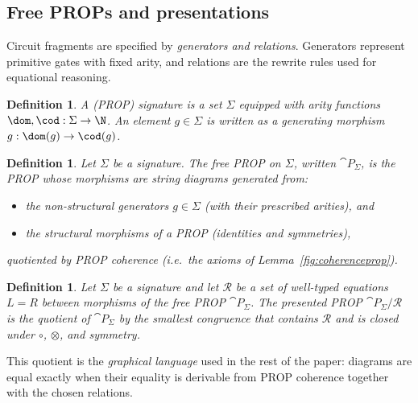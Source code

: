 \documentclass[10pt,a4paper]{article}
\newtheorem{definition}[theorem]{Definition}
\def\cref#1{Lemma~\ref{#1}}%
\begin{document}
\subsection{Free PROPs and presentations}\label{free-prop}

Circuit fragments are specified by \emph{generators and relations}.  Generators represent primitive
gates with fixed arity, and relations are the rewrite rules used for equational reasoning.

\begin{definition}\label{def:signature}
A \emph{(PROP) signature} is a set \(\Sigma\) equipped with arity functions
\(\dom,\cod:\Sigma\to\N\).
An element \(g\in\Sigma\) is written as a generating morphism \(g:\dom(g)\to\cod(g)\).
\end{definition}

\begin{definition}\label{def:free-prop}
Let \(\Sigma\) be a signature.  The \emph{free PROP} on \(\Sigma\), written \(\cat{P}_\Sigma\), is the
PROP whose morphisms are string diagrams generated from:
\begin{itemize}
\item the non-structural generators \(g\in\Sigma\) (with their prescribed arities), and
\item the structural morphisms of a PROP (identities and symmetries),
\end{itemize}
quotiented by PROP coherence (i.e.\ the axioms of \cref{fig:coherenceprop}).
\end{definition}

\begin{definition}\label{def:presented-prop}
Let \(\Sigma\) be a signature and let \(\mathcal{R}\) be a set of well-typed equations
\(L=R\) between morphisms of the free PROP \(\cat{P}_\Sigma\).
The \emph{presented PROP} \(\cat{P}_\Sigma/\mathcal{R}\) is the quotient of \(\cat{P}_\Sigma\)
by the smallest congruence that contains \(\mathcal{R}\) and is closed under \(\circ\), \(\otimes\),
and symmetry.
\end{definition}

This quotient is the \emph{graphical language} used in the rest of the paper: diagrams are equal exactly when their
equality is derivable from PROP coherence together with the chosen relations.

\end{document}
